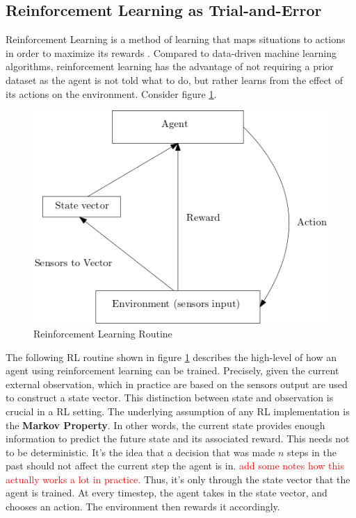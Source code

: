 \documentclass[a4paper,11pt]{article}
\begin{document}
\subsection{Reinforcement Learning as Trial-and-Error} 
Reinforcement Learning is a method of learning that maps situations to actions in order to maximize its rewards \cite{sutton2018reinforcement}. 
Compared to data-driven machine learning algorithms, reinforcement learning has the advantage of not requiring a prior dataset as the agent is not told what to do, but rather 
learns from the effect of its actions on the environment. Consider figure \ref{fig:rl}. 
\begin{figure}[H]
  \centering
  \includegraphics[scale=0.6]{rlroutine.png}
  \caption{Reinforcement Learning Routine}
  \label{fig:rl}
\end{figure}
The following RL routine shown in figure \ref{fig:rl} describes the high-level of how an agent using reinforcement learning can be trained. Precisely, 
given the current external observation, which in practice are based on the sensors output are used to construct a state vector. This distinction between state and observation 
is crucial in a RL setting. The underlying assumption of any RL implementation is the \textbf{Markov Property}. In other words, 
the current state provides enough information to predict the future state and its associated reward. This needs not to be deterministic. It's the idea that a decision that was made $n$ steps
in the past should not affect the current step the agent is in. \textcolor{red}{add some notes how this actually works a lot in practice.} Thus, it's only through the state vector that the agent is trained. 
At every timestep, the agent takes in the state vector, and chooses an action. The environment then rewards it accordingly.  
\end{document}
